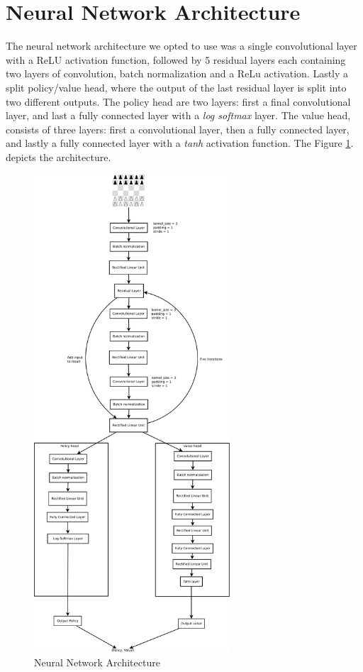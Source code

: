 \section{Neural Network Architecture}

The neural network architecture we opted to use was a single convolutional layer with a ReLU activation function, followed by 5 residual layers each containing two layers of convolution, batch normalization and a ReLu activation. Lastly a split policy/value head, where the output of the last residual layer is split into two different outputs. The policy head are two layers: first a final convolutional layer, and last a fully connected layer with a \textit{log softmax} layer. The value head, consists of three layers: first a convolutional layer, then a fully connected layer, and lastly a fully connected layer with a \textit{tanh} activation function. The Figure \ref{fig:nnarch}. depicts the architecture.

\begin{figure}[]
    \centering

    \includegraphics[width=0.65\textwidth]{graphics/test}
    
    \caption{Neural Network Architecture}
    \label{fig:nnarch}
\end{figure}


